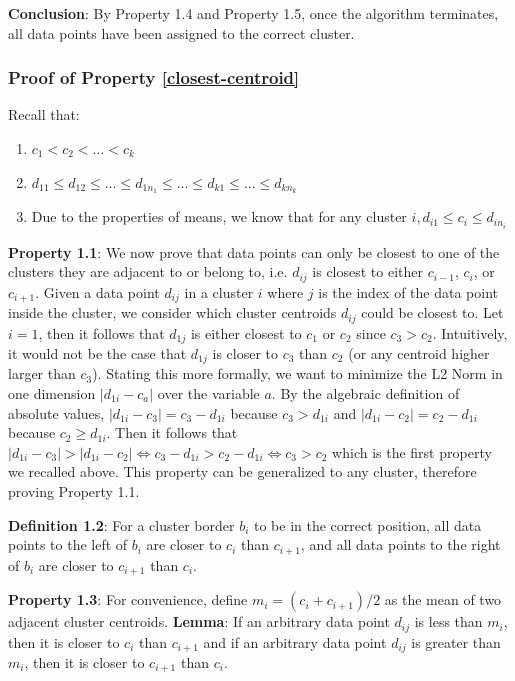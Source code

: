 \documentclass[conference,compsoc]{IEEEtran}
\begin{document}
\textbf{Conclusion}: By Property 1.4 and Property 1.5, once the algorithm terminates, all data points have been assigned to the correct cluster.


\subsubsection{Proof of Property \ref{closest-centroid}}

Recall that:
\begin{enumerate}
\item $c_1 < c_2 < \dots < c_k$
\item $d_{11} \leq d_{12} \leq \dots \leq d_{1n_1} \leq \dots \leq d_{k1} \leq \dots \leq d_{kn_k}$
\item Due to the properties of means, we know that for any cluster $i, d_{i1} \leq c_i \leq d_{in_i}$
\end{enumerate}

\textbf{Property 1.1}: We now prove that data points can only be closest to one of the clusters they are adjacent to or belong to, i.e. $d_{ij}$ is closest to either $c_{i-1}$, $c_i$, or $c_{i+1}$. Given a data point $d_{ij}$ in a cluster $i$ where $j$ is the index of the data point inside the cluster, we consider which cluster centroids $d_{ij}$ could be closest to. Let $i=1$, then it follows that $d_{1j}$ is either closest to $c_1$ or $c_2$ since $c_3 > c_2$. Intuitively, it would not be the case that $d_{1j}$ is closer to $c_3$ than $c_2$ (or any centroid higher larger than $c_3$). Stating this more formally, we want to minimize the L2 Norm in one dimension $|d_{1i} - c_a|$ over the variable $a$. By the algebraic definition of absolute values, $|d_{1i}-c_3| = c_3-d_{1i}$ because $c_3 > d_{1i}$ and $|d_{1i}-c_2| = c_2-d_{1i}$ because $c_2 \geq d_{1i}$. Then it follows that $|d_{1i} - c_3| > |d_{1i} - c_2| \iff c_3 - d_{1i} > c_2 - d_{1i} \iff c_3 > c_2$ which is the first property we recalled above. This property can be generalized to any cluster, therefore proving Property 1.1.

\textbf{Definition 1.2}: For a cluster border $b_i$ to be in the correct position, all data points to the left of $b_i$ are closer to $c_i$ than $c_{i+1}$, and all data points to the right of $b_i$ are closer to $c_{i+1}$ than $c_i$.

\textbf{Property 1.3}: For convenience, define $m_i = (c_i+c_{i+1})/2$ as the mean of two adjacent cluster centroids. \textbf{Lemma}: If an arbitrary data point $d_{ij}$ is less than $m_i$, then it is closer to $c_i$ than $c_{i+1}$ and if an arbitrary data point $d_{ij}$ is greater than $m_i$, then it is closer to $c_{i+1}$ than $c_i$.
\end{document}

